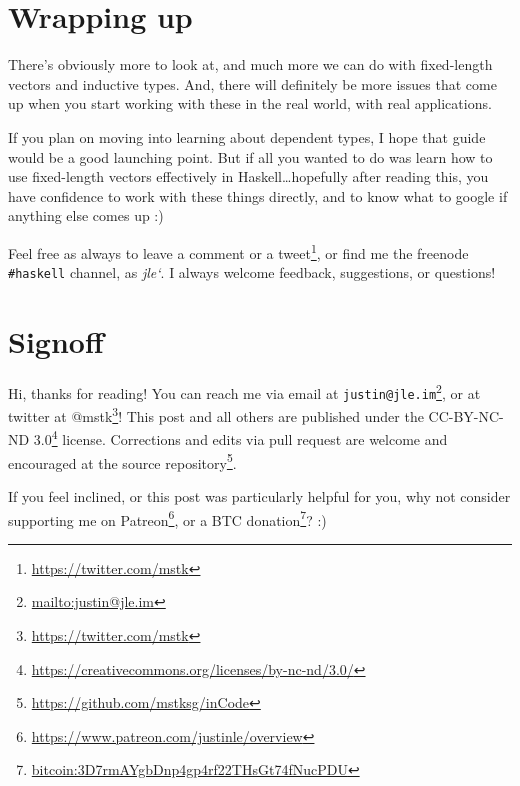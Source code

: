 \documentclass[]{article}
\renewcommand{\href}[2]{#2\footnote{\url{#1}}}
\begin{document}
\hypertarget{wrapping-up}{%
\section{Wrapping up}\label{wrapping-up}}

There's obviously more to look at, and much more we can do with fixed-length
vectors and inductive types. And, there will definitely be more issues that come
up when you start working with these in the real world, with real applications.

If you plan on moving into learning about dependent types, I hope that guide
would be a good launching point. But if all you wanted to do was learn how to
use fixed-length vectors effectively in Haskell\ldots hopefully after reading
this, you have confidence to work with these things directly, and to know what
to google if anything else comes up :)

Feel free as always to leave a comment or a
\href{https://twitter.com/mstk}{tweet}, or find me the freenode
\texttt{\#haskell} channel, as \emph{jle`}. I always welcome feedback,
suggestions, or questions!

\hypertarget{signoff}{%
\section{Signoff}\label{signoff}}

Hi, thanks for reading! You can reach me via email at
\href{mailto:justin@jle.im}{\nolinkurl{justin@jle.im}}, or at twitter at
\href{https://twitter.com/mstk}{@mstk}! This post and all others are published
under the \href{https://creativecommons.org/licenses/by-nc-nd/3.0/}{CC-BY-NC-ND
3.0} license. Corrections and edits via pull request are welcome and encouraged
at \href{https://github.com/mstksg/inCode}{the source repository}.

If you feel inclined, or this post was particularly helpful for you, why not
consider \href{https://www.patreon.com/justinle/overview}{supporting me on
Patreon}, or a \href{bitcoin:3D7rmAYgbDnp4gp4rf22THsGt74fNucPDU}{BTC donation}?
:)
\end{document}
